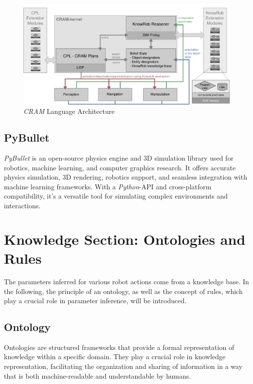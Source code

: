 \begin{figure}[H]
\includegraphics[scale=1.5]{Graphics/cram-language-architecture.png}
\caption{\textit{CRAM} \cite{beetz10cram} Language Architecture}
\end{figure}

\subsection{PyBullet}
\label{sec:pybullet}
\textit{PyBullet}\cite{coumans2021} is an open-source physics engine and 3D simulation library used for robotics, machine learning, and computer graphics research. 
It offers accurate physics simulation, 3D rendering, robotics support, and seamless integration with machine learning frameworks. 
With a \textit{Python}-API and cross-platform compatibility, it's a versatile tool for simulating complex environments and interactions.

\section{Knowledge Section: Ontologies and Rules}
The parameters inferred for various robot actions come from a knowledge base. In the following, the principle of an ontology, as well as the concept of rules, which play a crucial role in parameter inference, will be introduced.
\subsection{Ontology}
Ontologies \cite{ontotext} are structured frameworks that provide a formal representation of knowledge within a specific domain. They play a crucial role in knowledge representation, facilitating the organization and sharing of information in a way that is both machine-readable and understandable by humans. 

